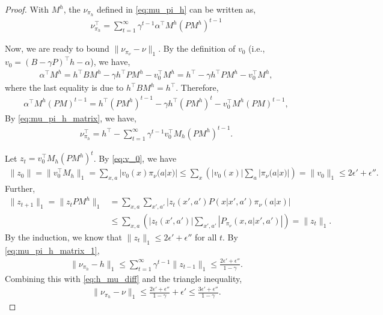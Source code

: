 \documentclass[11pt]{article}
\begin{document}
\begin{proof}
  With $M^h$, the $\nu_{\pi_{h}}$ defined in \eqref{eq:mu_pi_h} can be written as,
  \begin{eqnarray}
    \nu_{\pi_{h}}^\top=\sum_{t=1}^{\infty}\gamma^{t-1}   \alpha^\top M^h (PM^h)^{t-1}
    \label{eq:mu_pi_h_matrix}
  \end{eqnarray}

  Now, we are ready to bound $\|\nu_{\pi_\nu} - \nu\|_1$. By the definition of $v_0$ (i.e., $v_0=(B-\gamma P)^\top h - \alpha$), we have,
  \begin{eqnarray*}
    \alpha^\top M^h = h^\top B M^h - \gamma h^\top P M^h - v_0^\top M^h=h^\top- \gamma h^\top P M^h - v_0^\top M^h,
  \end{eqnarray*}
  where the last equality is due to $h^\top B M^h= h^\top$. Therefore,
  \begin{eqnarray*}
     \alpha^\top M^h (PM)^{t-1} = h^\top  (PM^h)^{t-1} - \gamma  h^\top (P M^h)^t - v_0^\top M^h (PM)^{t-1}  ,
  \end{eqnarray*}
  By \eqref{eq:mu_pi_h_matrix}, we have,
  \begin{eqnarray}
     \nu_{\pi_{h}}^\top=h^\top - \sum_{t=1}^{\infty} \gamma^{t-1} v_0^\top M_h (PM^h)^{t-1}.
     \label{eq:mu_pi_h_matrix_1}
  \end{eqnarray}

  Let $z_{t}=v_0^\top M_h (PM^h)^{t}$.  By \eqref{eq:v_0}, we have
  \begin{eqnarray*}
    \|z_0\|=\|v_0^\top M_h\|_1 =\sum_{x,a} |v_0(x) \pi_\nu(a|x)| \leq \sum_{x} \left( |v_0(x)| \sum_a |\pi_\nu(a|x)|\right)= \|v_0\|_1 \leq 2 \epsilon' + \epsilon''.
  \end{eqnarray*}
  Further,
  \begin{align*}
    \|z_{t+1}\|_1 =\|z_t P M^h\|_1 &= \sum_{x,a}\sum_{x',a'} \left| z_t(x',a') P(x|x',a') \pi_\nu(a|x) \right| \\
      &\leq \sum_{x,a}\left(  \left| z_t(x',a')\right|  \sum_{x',a'} \left| P_{\pi_\nu} (x, a|x',a') \right| \right) = \|z_t\|_1.
  \end{align*}
  By the induction, we know that $\|z_t\|_1 \leq 2 \epsilon' + \epsilon''$ for all $t$. By \eqref{eq:mu_pi_h_matrix_1},
  \begin{eqnarray}
    \|\nu_{\pi_{h}}-h\|_1 \leq \sum_{t=1}^{\infty} \gamma^{t-1} \|z_{t-1}\|_1 \leq \frac{2 \epsilon' + \epsilon''}{1-\gamma}.
  \end{eqnarray}
  Combining this with \eqref{eq:h_mu_diff} and the triangle inequality,
  \begin{eqnarray}
    \|\nu_{\pi_{h}}- \nu \|_1 \leq \frac{2 \epsilon' + \epsilon''}{1-\gamma} +\epsilon' \leq \frac{3 \epsilon' + \epsilon''}{1-\gamma}.
  \end{eqnarray}
\end{proof}
\end{document}

